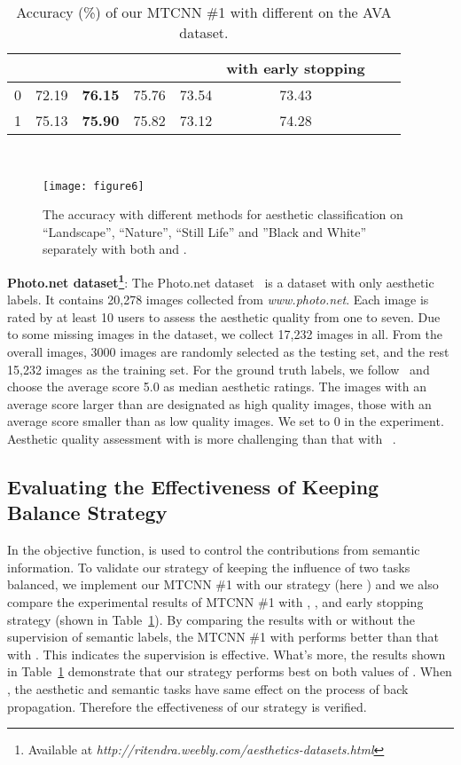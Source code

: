 \documentclass[journal]{IEEEtran}
\begin{document}
\begin{table}
\caption{Accuracy (\%) of our MTCNN \#1 with different   on  the AVA dataset.}
\renewcommand{\arraystretch}{1.4}
\setlength{\abovecaptionskip}{0pt}
\setlength{\belowcaptionskip}{0pt}
\arrayrulewidth=0.6pt \tabcolsep=4pt
  \centering
  \footnotesize
  \begin{tabular}{|c|c|c|c|c|c|c|c|}
    \hline
  & &&& & with early stopping\\
    \hline
0 &72.19&\textbf{76.15}&75.76 &73.54& 73.43\\
     \hline
    1 &75.13&\textbf{75.90}&75.82&73.12& 74.28\\
\hline
  \end{tabular}
  \verb''\\
\label{tab:table1}
\end{table}
\begin{figure*}
  \centering
\texttt{[image: figure6]}\\
\caption{The accuracy with different methods for aesthetic classification on ``Landscape'', ``Nature'', ``Still Life'' and ''Black and White'' separately with both  and . }
  \label{fig:tag4}
\end{figure*}
\noindent\textbf{Photo.net dataset\footnote{Available at \emph{http://ritendra.weebly.com/aesthetics-datasets.html}}}: The Photo.net dataset~\cite{Datta08,Datta06} is a dataset with only aesthetic labels. It contains 20,278 images collected from \emph{www.photo.net}. Each image is rated by at least 10 users to assess the aesthetic quality from one to seven. Due to some missing images in the dataset, we collect 17,232 images in all. From the overall images, 3000 images are randomly selected as the testing set, and the rest 15,232 images as the training set. For the ground truth labels, we follow~\cite{Datta06} and choose the average score 5.0 as median aesthetic ratings. The images with an average score larger than  are designated as high quality images, those with an average score smaller than  as low quality images. We set  to 0 in the experiment. Aesthetic quality assessment with  is more challenging than that with ~\cite{Murray12}.

\subsection{Evaluating the Effectiveness of Keeping Balance Strategy}
In the objective function,  is used to control the contributions from semantic information. To validate our strategy of keeping the influence of two tasks balanced, we implement our MTCNN \#1 with our strategy  (here ) and we also compare the experimental results of MTCNN \#1 with , ,  and early stopping strategy (shown in Table~\ref{tab:table1}). By comparing the results with or without the supervision of semantic labels, the MTCNN \#1 with  performs better than that with . This indicates the supervision is effective. What's more, the results shown in Table~\ref{tab:table1} demonstrate that our strategy  performs best on both values of . When , the aesthetic and semantic tasks have same effect on the process of back propagation. Therefore the effectiveness of our strategy is verified.
\end{document}
